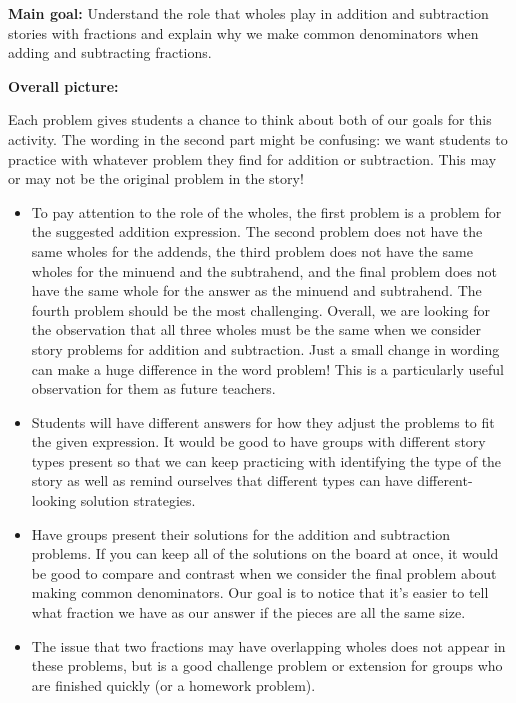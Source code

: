 \documentclass[nooutcomes,noauthor, handout]{ximera}
\begin{document}
\begin{instructorNotes} 



{\bf Main goal:} Understand the role that wholes play in addition and subtraction stories with fractions and explain why we make common denominators when adding and subtracting fractions.

{\bf Overall picture:}

Each problem gives students a chance to think about both of our goals for this activity. The wording in the second part might be confusing: we want students to practice with whatever problem they find for addition or subtraction. This may or may not be the original problem in the story!

\begin{itemize}
	\item To pay attention to the role of the wholes, the first problem is a problem for the suggested addition expression. The second problem does not have the same wholes for the addends, the third problem does not have the same wholes for the minuend and the subtrahend, and the final problem does not have the same whole for the answer as the minuend and subtrahend. The fourth problem should be the most challenging. Overall, we are looking for the observation that all three wholes must be the same when we consider story problems for addition and subtraction. Just a small change in wording can make a huge difference in the word problem! This is a particularly useful observation for them as future teachers.
	\item Students will have different answers for how they adjust the problems to fit the given expression. It would be good to have groups with different story types present so that we can keep practicing with identifying the type of the story as well as remind ourselves that different types can have different-looking solution strategies.
	\item Have groups present their solutions for the addition and subtraction problems. If you can keep all of the solutions on the board at once, it would be good to compare and contrast when we consider the final problem about making common denominators. Our goal is to notice that it's easier to tell what fraction we have as our answer if the pieces are all the same size. 
	\item The issue that two fractions may have overlapping wholes does not appear in these problems, but is a good challenge problem or extension for groups who are finished quickly (or a homework problem).
\end{itemize}





\end{instructorNotes}
\end{document}

